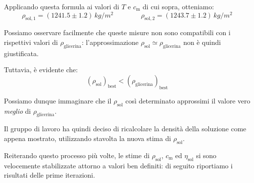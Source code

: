 \documentclass{article}
\begin{document}
Applicando questa formula ai valori di $T$ e $c_\text{m}$ di cui
sopra, otteniamo:
\[
  \rho_{\text{sol},1} = (1241.5\pm1.2)\,\unit{kg \per m^2}
  \qquad\qquad
  \rho_{\text{sol},2} = (1243.7\pm1.2)\,\unit{kg \per m^2}
\]

Possiamo osservare facilmente che queste misure non sono compatibili
con i rispettivi valori di $\rho_\text{glicerina}$: l'approssimazione
$\rho_\text{sol} \simeq \rho_\text{glicerina}$ non è quindi
giustificata.

Tuttavia, è evidente che:
\[(\rho_\text{sol})_\text{best} < (\rho_\text{glicerina})_\text{best}\]

Possiamo dunque immaginare che il $\rho_\text{sol}$ così determinato
approssimi il valore vero \emph{meglio} di $\rho_\text{glicerina}$.

Il gruppo di lavoro ha quindi deciso di ricalcolare la densità della
soluzione come appena mostrato, utilizzando stavolta la nuova stima di
$\rho_\text{sol}$.

\vspace{2mm}

Reiterando questo processo più volte, le stime di
$\rho_\text{sol}$, $c_\text{m}$ ed $\eta_\text{sol}$ si sono
velocemente stabilizzate attorno a valori ben definiti:
di seguito riportiamo i risultati delle prime iterazioni.
\end{document}
